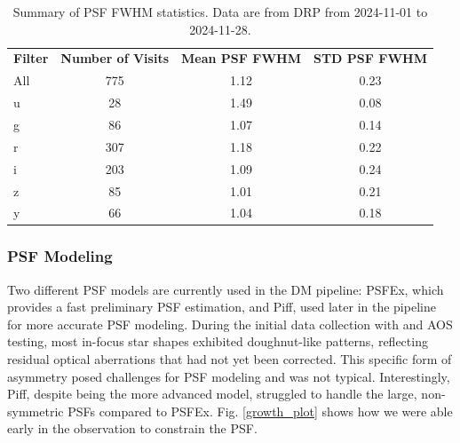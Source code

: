 \begin{table}
\centering
\begin{tabular}{@{}lccc@{}}
\textbf{Filter} & \textbf{Number of Visits} & \textbf{Mean PSF FWHM} & \textbf{STD PSF FWHM} \\ 
All           & 775                      & 1.12                   & 0.23                  \\
u             & 28                       & 1.49                   & 0.08                  \\
g             & 86                       & 1.07                   & 0.14                  \\
r             & 307                      & 1.18                   & 0.22                  \\
i             & 203                      & 1.09                   & 0.24                  \\
z             & 85                       & 1.01                   & 0.21                  \\
y             & 66                       & 1.04                   & 0.18                  \\ 
\end{tabular}
\caption{Summary of PSF FWHM statistics. Data are from DRP from 2024-11-01 to 2024-11-28.}
\label{tab:psf_summary}
\end{table}


\subsubsection{PSF Modeling}

Two different PSF models are currently used in the DM pipeline: PSFEx, which provides a fast preliminary PSF estimation, and Piff, used later in the pipeline for more accurate PSF modeling. During the initial data collection with \ComCam and AOS testing, most in-focus star shapes exhibited doughnut-like patterns, reflecting residual optical aberrations that had not yet been corrected. This specific form of asymmetry posed challenges for PSF modeling and was not typical. Interestingly, Piff, despite being the more advanced model, struggled to handle the large, non-symmetric PSFs compared to PSFEx. Fig. \ref{growth_plot} shows how we were able early in the observation to constrain the PSF.


